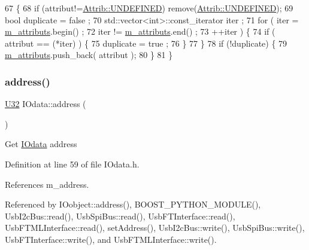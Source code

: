 \begin{DoxyCode}
67                             \{
68     \textcolor{keywordflow}{if} (attribut!=\hyperlink{classAttrib_a69e171d7cc6417835a5a306d3c764235a3a8da2ab97dda18aebab196fe4100531}{Attrib::UNDEFINED}) \textcolor{keyword}{remove}(\hyperlink{classAttrib_a69e171d7cc6417835a5a306d3c764235a3a8da2ab97dda18aebab196fe4100531}{Attrib::UNDEFINED});
69     \textcolor{keywordtype}{bool} duplicate = false ;
70     std::vector<int>::const\_iterator iter ;
71     \textcolor{keywordflow}{for} ( iter  = \hyperlink{classAttrib_ac4bd58a0cc6b38a3b711d609a3d3aacc}{m\_attributs}.begin() ;
72           iter != \hyperlink{classAttrib_ac4bd58a0cc6b38a3b711d609a3d3aacc}{m\_attributs}.end()   ;
73           ++iter ) \{
74       \textcolor{keywordflow}{if} ( attribut == (*iter) ) \{
75         duplicate = true ;
76       \}
77     \}
78     \textcolor{keywordflow}{if} (!duplicate) \{
79       \hyperlink{classAttrib_ac4bd58a0cc6b38a3b711d609a3d3aacc}{m\_attributs}.push\_back( attribut );
80     \}
81   \}
\end{DoxyCode}
\mbox{\label{classIOdata_afe410c86881b8c2082a08e5ce9843306}} 
\subsubsection{\texorpdfstring{address()}{address()}}
{\footnotesize\ttfamily \hyperlink{classIOdata_a96fb57f5fcd87b708743abd3c86a5198}{U32} I\+Odata\+::address (\begin{DoxyParamCaption}{ }\end{DoxyParamCaption})\hspace{0.3cm}{\ttfamily [inline]}}

Get \hyperlink{classIOdata}{I\+Odata} address 

Definition at line 59 of file I\+Odata.\+h.



References m\+\_\+address.



Referenced by I\+Oobject\+::address(), B\+O\+O\+S\+T\+\_\+\+P\+Y\+T\+H\+O\+N\+\_\+\+M\+O\+D\+U\+L\+E(), Usb\+I2c\+Bus\+::read(), Usb\+Spi\+Bus\+::read(), Usb\+F\+T\+Interface\+::read(), Usb\+F\+T\+M\+L\+Interface\+::read(), set\+Address(), Usb\+I2c\+Bus\+::write(), Usb\+Spi\+Bus\+::write(), Usb\+F\+T\+Interface\+::write(), and Usb\+F\+T\+M\+L\+Interface\+::write().


